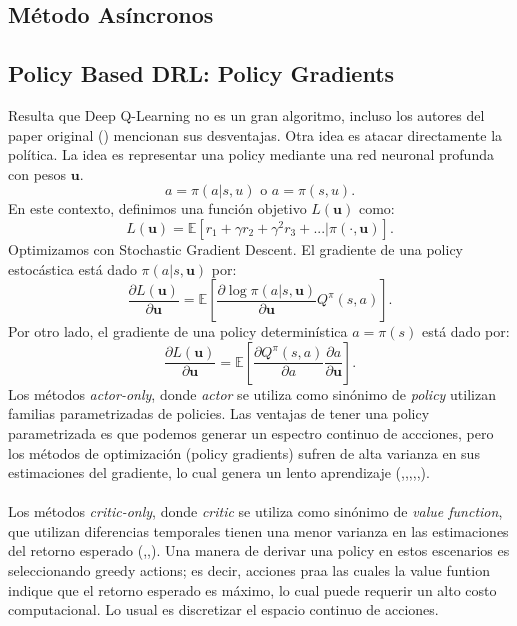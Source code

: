 \documentclass[11pt]{article}
\theoremstyle{plain}
\begin{document}
\subsection{Método Asíncronos}  
\subsection{Policy Based DRL: Policy Gradients}
Resulta que Deep Q-Learning no es un gran algoritmo, incluso los autores del paper original (\cite{DBLP:journals/corr/MnihBMGLHSK16}) mencionan sus desventajas. 
Otra idea es atacar directamente la política.
La idea es representar una policy mediante una red neuronal profunda con pesos $\textbf{u}$.
\[ a = \pi (a|s,u) \textrm{ o } a = \pi (s,u). \]
En este contexto, definimos una función objetivo $L(\textbf{u})$ como:
		\[ L(\textbf{u}) = \mathbb{E}[r_1 + \gamma r_2 + \gamma^2 r_3 + ... |  \pi(\cdot,\textbf{u})]. \]
Optimizamos con Stochastic Gradient Descent. El gradiente de una policy estocástica está dado $\pi (a|s,\textbf{u})$ por:
		\[ \frac{\partial L(\textbf{u})}{\partial \textbf{u}}  = \mathbb{E}\left[  \frac{\partial \log \pi(a|s,\textbf{u})}{\partial \textbf{u}}Q^\pi(s,a)\right].\]
Por otro lado, el gradiente de una policy determinística $a=\pi(s)$ está dado por:
\[ \frac{\partial L(\textbf{u})}{\partial \textbf{u}}  = \mathbb{E}\left[ \frac{\partial Q^\pi (s,a)}{\partial a} \frac{\partial a}{\partial \textbf{u}} \right]. \]
 Los métodos \textit{actor-only}, donde \textit{actor} se utiliza como sinónimo de \textit{policy} utilizan familias parametrizadas de policies. Las ventajas de tener una policy parametrizada es que podemos generar un espectro continuo de accciones, pero los métodos de optimización (policy gradients) sufren de alta varianza en sus estimaciones del gradiente, lo cual genera un lento aprendizaje (\cite{grondman2012survey},\cite{konda2003onactor},\cite{richter2007natural},\cite{boyan2002technical},\cite{baxter2001infinite},\cite{berenji2003convergent}).\\
 \\
Los métodos \textit{critic-only}, donde \textit{critic} se utiliza como sinónimo de \textit{value function}, que utilizan diferencias temporales tienen una menor varianza en las estimaciones del retorno esperado (\cite{boyan2002technical},\cite{berenji2003convergent},\cite{sutton1988learning}). Una manera de derivar una policy en estos escenarios es seleccionando greedy actions; es decir, acciones praa las cuales la value funtion indique que el retorno esperado es máximo, lo cual puede requerir un alto costo computacional. Lo usual es discretizar el espacio continuo de acciones.
\end{document}
